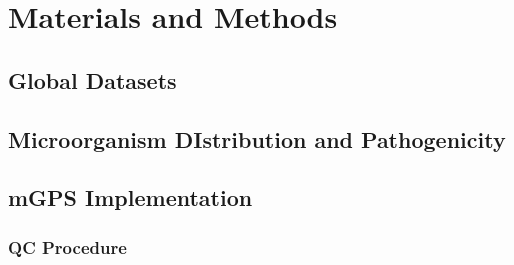 \section{Materials and Methods}
\subsection{Global Datasets}
\subsection{Microorganism DIstribution and Pathogenicity}
\subsection{mGPS Implementation}
\subsubsection{QC Procedure}
